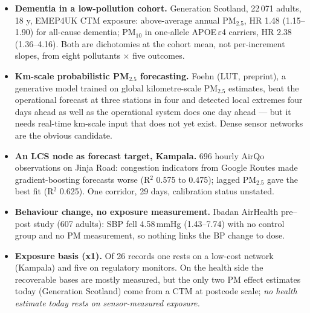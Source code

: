 \documentclass[10pt]{article}
\begin{document}
\footnotesize
\begin{itemize}

\item \textbf{Dementia in a low-pollution cohort.} Generation Scotland, 22\,071 adults, 18 y, EMEP4UK CTM exposure: above-average annual PM$_{2.5}$, HR 1.48 (1.15--1.90) for all-cause dementia; PM$_{10}$ in one-allele APOE\,$\varepsilon$4 carriers, HR 2.38 (1.36--4.16). Both are dichotomies at the cohort mean, not per-increment slopes, from eight pollutants $\times$ five outcomes.

\item \textbf{Km-scale probabilistic PM$_{2.5}$ forecasting.} Foehn (LUT, preprint), a generative model trained on global kilometre-scale PM$_{2.5}$ estimates, beat the operational forecast at three stations in four and detected local extremes four days ahead as well as the operational system does one day ahead --- but it needs real-time km-scale input that does not yet exist. Dense sensor networks are the obvious candidate.

\item \textbf{An LCS node as forecast target, Kampala.} 696 hourly AirQo observations on Jinja Road: congestion indicators from Google Routes made gradient-boosting forecasts worse (R$^2$ 0.575 to 0.475); lagged PM$_{2.5}$ gave the best fit (R$^2$ 0.625). One corridor, 29 days, calibration status unstated.

\item \textbf{Behaviour change, no exposure measurement.} Ibadan AirHealth pre--post study (607 adults): SBP fell 4.58\,mmHg (1.43--7.74) with no control group and no PM measurement, so nothing links the BP change to dose.

\item \textbf{Exposure basis (x1).} Of 26 records one rests on a low-cost network (Kampala) and five on regulatory monitors. On the health side the recoverable bases are mostly measured, but the only two PM effect estimates today (Generation Scotland) come from a CTM at postcode scale; \emph{no health estimate today rests on sensor-measured exposure.}

\end{itemize}

\vspace{2mm}
\end{document}

